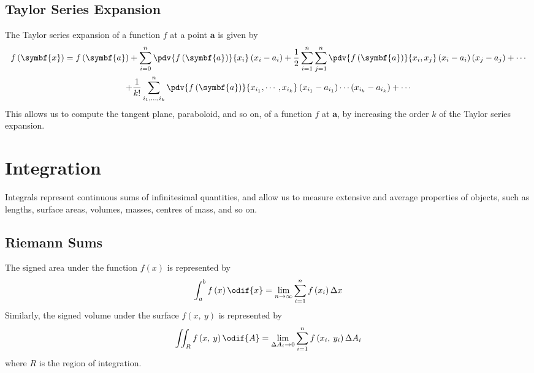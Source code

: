 \documentclass{article}
\begin{document}
\subsection{Taylor Series Expansion}
The Taylor series expansion of a function \(f\) at a point
\(\symbf{a}\) is given by
\begin{multline*}
    f\left( \symbf{x} \right) = f\left( \symbf{a} \right) + \sum_{i = 0}^n \pdv{f\left( \symbf{a} \right)}{x_i} \left( x_i - a_i \right) + \frac{1}{2} \sum_{i = 1}^n \sum_{j = 1}^n \pdv{f\left( \symbf{a} \right)}{x_i,x_j} \left( x_i - a_i \right) \left( x_j - a_j \right) + \cdots \\
    + \frac{1}{k!} \sum_{i_1, \ldots, i_k}^{n} \pdv{f\left( \symbf{a} \right)}{x_{i_1}, \cdots, x_{i_k}} \left( x_{i_1} - a_{i_1} \right) \cdots \left( x_{i_k} - a_{i_k} \right) + \cdots
\end{multline*}
This allows us to compute the tangent plane, paraboloid, and so on, of
a function \(f\) at \(\symbf{a}\), by increasing the order \(k\) of the
Taylor series expansion.
\section{Integration}
Integrals represent continuous sums of infinitesimal quantities, and
allow us to measure extensive and average properties of objects, such
as lengths, surface areas, volumes, masses, centres of mass, and so on.
\subsection{Riemann Sums}
The signed area under the function \(f\left( x \right)\) is represented
by
\begin{equation*}
    \int_a^b f\left( x \right) \odif{x} = \lim_{n \to \infty} \sum_{i = 1}^n f\left( x_i \right) \Delta x
\end{equation*}
Similarly, the signed volume under the surface \(f\left( x,\: y \right)\)
is represented by
\begin{equation*}
    \iint_R f\left( x,\: y \right) \odif{A} = \lim_{\Delta A_i \to 0} \sum_{i = 1}^n f\left( x_i,\: y_i \right) \Delta A_i
\end{equation*}
where \(R\) is the region of integration.
\end{document}
